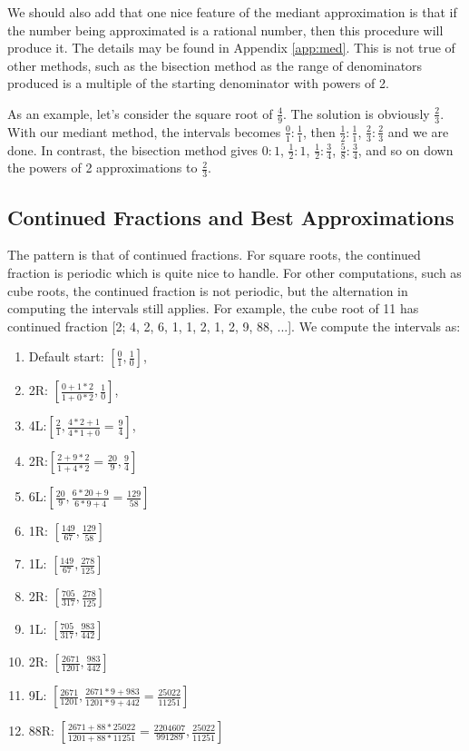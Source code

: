 \documentclass[12pt]{article}
\theoremstyle{remark}
\begin{document}
We should also add that one nice feature of the mediant approximation is that if the number being approximated is a rational number, then this procedure will produce it. The details may be found in Appendix \ref{app:med}. This is not true of other methods, such as the bisection method as the range of denominators produced is a multiple of the starting denominator with powers of 2. 

As an example, let's consider the square root of $\frac{4}{9}$. The solution is obviously $\frac{2}{3}$. With our mediant method, the intervals becomes $\frac{0}{1}:\frac{1}{1}$, then $\frac{1}{2}:\frac{1}{1}$, $\frac{2}{3}:\frac{2}{3}$ and we are done. In contrast, the bisection method gives $0:1$, $\frac{1}{2}:1$, $\frac{1}{2}:\frac{3}{4}$, $\frac{5}{8}:\frac{3}{4}$, and so on down the powers of 2 approximations to $\frac{2}{3}$. 

\subsection{Continued Fractions and Best Approximations}


The pattern is that of continued fractions. For square roots, the continued fraction is periodic which is quite nice to handle. For other computations, such as cube roots, the continued fraction is not periodic, but the alternation in computing the intervals still applies. For example, the cube root of 11 has continued fraction [2; 4, 2, 6, 1, 1, 2, 1, 2, 9, 88, ...]. We compute the intervals as:  
\begin{enumerate}
\item Default start: $[\frac{0}{1}, \frac{1}{0}]$, 
\item 2R: $[\frac{0+1*2}{1+0*2}, \frac{1}{0}]$, 
\item 4L:$[\frac{2}{1}, \frac{4*2+1}{4*1+0} =\frac{9}{4}]$, 
\item 2R:$[\frac{2+9*2}{1+4*2} = \frac{20}{9}, \frac{9}{4}]$
\item 6L:$[\frac{20}{9}, \frac{6*20+9}{6*9 + 4} = \frac{129}{58}]$
\item 1R: $[\frac{149}{67}, \frac{129}{58}]$
\item 1L: $[\frac{149}{67}, \frac{278}{125}]$
\item 2R: $[\frac{705}{317}, \frac{278}{125}]$
\item 1L: $[\frac{705}{317}, \frac{983}{442}]$
\item 2R: $[\frac{2671}{1201}, \frac{983}{442}]$
\item 9L: $[\frac{2671}{1201}, \frac{2671*9+983}{1201*9+442} = \frac{25022}{11251}]$
\item 88R: $[\frac{2671+88*25022}{1201+88*11251} = \frac{2204607}{991289}, \frac{25022}{11251}]$
\end{enumerate}
\end{document}
